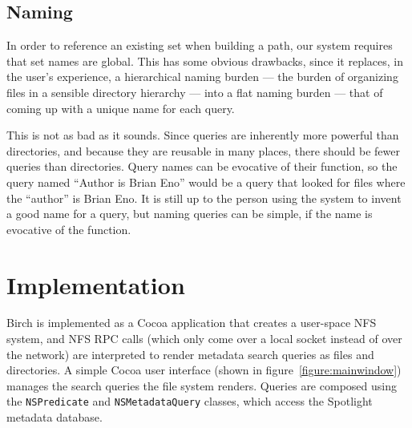 \documentclass{article}
\begin{document}
\subsection{Naming}

In order to reference an existing set when building a path, our system
requires that set names are global. This has some obvious drawbacks,
since it replaces, in the user's experience, a hierarchical naming
burden --- the burden of organizing files in a sensible directory
hierarchy --- into a flat naming burden --- that of coming up with a
unique name for each query.

This is not as bad as it sounds. Since queries are inherently more
powerful than directories, and because they are reusable in many
places, there should be fewer queries than directories. Query names
can be evocative of their function, so the query named ``Author is
Brian Eno'' would be a query that looked for files where the
``author'' is Brian Eno. It is still up to the person using the system
to invent a good name for a query, but naming queries can be simple,
if the name is evocative of the function.

\section{Implementation}

Birch is implemented as a Cocoa application that creates a user-space
NFS system, and NFS RPC calls (which only come over a local socket
instead of over the network) are interpreted to render metadata search
queries as files and directories. A simple Cocoa user interface (shown
in figure~\ref{figure:mainwindow}) manages the search queries the
file system renders. Queries are composed using the
\texttt{NSPredicate} and \texttt{NSMetadataQuery} classes, which
access the Spotlight metadata database.
\end{document}
